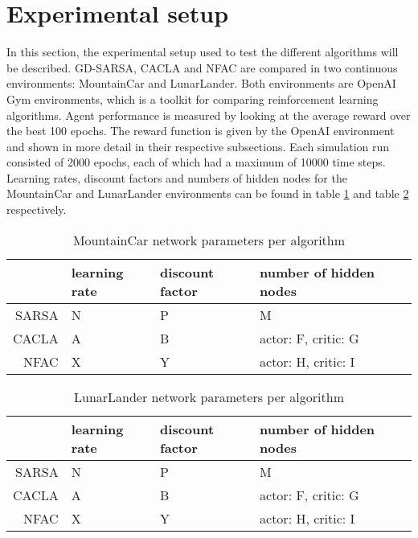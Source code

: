 
\section{Experimental setup}

In this section, the experimental setup used to test the different algorithms will be described. GD-SARSA, CACLA and NFAC are compared in two continuous environments: MountainCar\cite{openaimountaincar} and LunarLander\cite{openailunarlander}. Both environments are OpenAI Gym environments\cite{openaigym}, which is a toolkit for comparing reinforcement learning algorithms.  Agent performance is measured by looking at the average reward over the best 100 epochs. The reward function is given by the OpenAI environment and shown in more detail in their respective subsections. Each simulation run consisted of 2000 epochs, each of which had a maximum of 10000 time steps. Learning rates, discount factors and numbers of hidden nodes for the MountainCar and LunarLander environments can be found in table \ref{tab:mntparam} and table \ref{tab:lunarparam} respectively. 

\begin{table}
\centering
\label{tab:mntparam}
\begin{tabular}{r|llll}
                     & learning rate & discount factor & number of hidden nodes \\\hline
SARSA & N          & P               & M         \\
CACLA & A          & B               & actor: F, critic: G         \\
NFAC    & X          & Y              & actor: H, critic: I        
\end{tabular}
\caption{MountainCar network parameters per algorithm}
\end{table}

\begin{table}
\centering
\label{tab:lunarparam}
\begin{tabular}{r|llll}
                     & learning rate & discount factor & number of hidden nodes \\\hline
SARSA & N          & P               & M         \\
CACLA & A          & B               & actor: F, critic: G         \\
NFAC    & X          & Y              & actor: H, critic: I        
\end{tabular}
\caption{LunarLander network parameters per algorithm}
\end{table}



